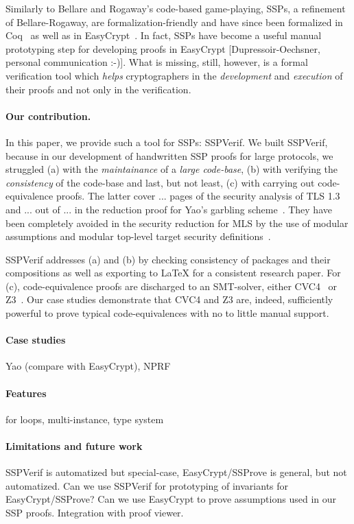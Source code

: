 Similarly to Bellare and Rogaway's code-based game-playing, SSPs, a refinement of Bellare-Rogaway, are formalization-friendly and have since been formalized in Coq~\cite{X} as well as in EasyCrypt~\cite{X}. In fact, SSPs have become a useful manual prototyping step for developing proofs in EasyCrypt [Dupressoir-Oechsner, personal communication :-)]. What is missing, still, however, is a formal verification tool which \emph{helps} cryptographers in the \emph{development} and \emph{execution} of their proofs and not only in the verification.

\paragraph{Our contribution.} In this paper, we provide such a tool for SSPs: SSPVerif. 
We built SSPVerif, because in our development of handwritten SSP proofs for large protocols, we struggled (a) with the \emph{maintainance} of a \emph{large code-base}, (b) with verifying the \emph{consistency} of the code-base and last, but not least, (c) with carrying out code-equivalence proofs. The latter cover ... pages of the security analysis of TLS 1.3~\cite{X} and ... out of ... in the reduction proof for Yao's garbling scheme~\cite{X}. They have been completely avoided in the security reduction for MLS by the use of modular assumptions and modular top-level target security definitions~\cite{X}.

SSPVerif addresses (a) and (b) by checking consistency of packages and their compositions as well as exporting to LaTeX for a consistent research paper. For (c), code-equivalence proofs are discharged to an SMT-solver, either CVC4~\cite{X} or Z3~\cite{X}. Our case studies demonstrate that CVC4 and Z3 are, indeed, sufficiently powerful to prove typical code-equivalences with no to little manual support. 

\paragraph{Case studies}
Yao (compare with EasyCrypt), NPRF

\paragraph{Features}
for loops, multi-instance, type system

\paragraph{Limitations and future work}
SSPVerif is automatized but special-case, EasyCrypt/SSProve is general, but not automatized. Can we use SSPVerif for prototyping of invariants for EasyCrypt/SSProve? Can we use EasyCrypt to prove assumptions used in our SSP proofs. Integration with proof viewer.





